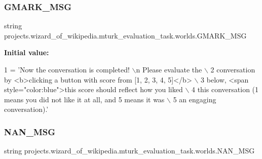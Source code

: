 \subsubsection{\texorpdfstring{G\+M\+A\+R\+K\+\_\+\+M\+SG}{GMARK\_MSG}}
{\footnotesize\ttfamily string projects.\+wizard\+\_\+of\+\_\+wikipedia.\+mturk\+\_\+evaluation\+\_\+task.\+worlds.\+G\+M\+A\+R\+K\+\_\+\+M\+SG}

{\bfseries Initial value\+:}
\begin{DoxyCode}
1 =  \textcolor{stringliteral}{'Now the conversation is completed! \(\backslash\)n Please evaluate the \(\backslash\)}
2 \textcolor{stringliteral}{    conversation by <b>clicking a button with score from [1, 2, 3, 4, 5]</b> \(\backslash\)}
3 \textcolor{stringliteral}{    below, <span style="color:blue">this score should reflect how you liked \(\backslash\)}
4 \textcolor{stringliteral}{    this conversation (1 means you did not like it at all, and 5 means it was  \(\backslash\)}
5 \textcolor{stringliteral}{    an engaging conversation).'}
\end{DoxyCode}
\mbox{\label{namespaceprojects_1_1wizard__of__wikipedia_1_1mturk__evaluation__task_1_1worlds_a044f9985e001f2473cd4fbe0c7482abe}} 
\subsubsection{\texorpdfstring{N\+A\+N\+\_\+\+M\+SG}{NAN\_MSG}}
{\footnotesize\ttfamily string projects.\+wizard\+\_\+of\+\_\+wikipedia.\+mturk\+\_\+evaluation\+\_\+task.\+worlds.\+N\+A\+N\+\_\+\+M\+SG}

